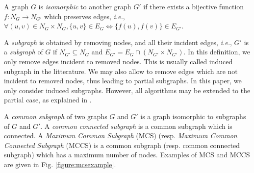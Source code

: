 \documentclass{llncs}
\begin{document}
A graph $G$ is \emph{isomorphic} to another graph $G'$ if there exists a bijective function $f:N_G\rightarrow N_{G'}$ which preserves edges, \emph{i.e.}, $\forall (u,v)\in N_G\times N_G, \{u,v\}\in E_G\Leftrightarrow \{f(u),f(v)\}\in E_{G'}$.

A {\em subgraph} is obtained by removing nodes, and all their incident edges, {\em i.e.}, $G'$ is a \emph{subgraph} of $G$ if $N_{G'}\subseteq N_G$ and $E_{G'}=E_G\cap(N_{G'}\times N_{G'})$.
In this definition, we only remove edges incident to removed nodes. This is usually called induced subgraph in the litterature. We may also allow to remove edges which are not incident to removed nodes, thus leading to partial subgraphs. In this paper, we only consider induced subgraphs. However, all algorithms may be extended to the partial case, as explained in \cite{DBLP:conf/cp/NdiayeS11}.

A \emph{common subgraph} of two graphs $G$ and $G'$ is a graph isomorphic to subgraphs of $G$ and $G'$. A \emph{common connected subgraph} is a common subgraph which is connected.
A \emph{Maximum Common Subgraph} (MCS) (resp. \emph{Maximum Common Connected Subgraph} (MCCS) is a common subgraph (resp. common connected subgraph) which has a maximum number of nodes. Examples of MCS and MCCS are given in Fig. \ref{figure:mcsexample}.
\end{document}
